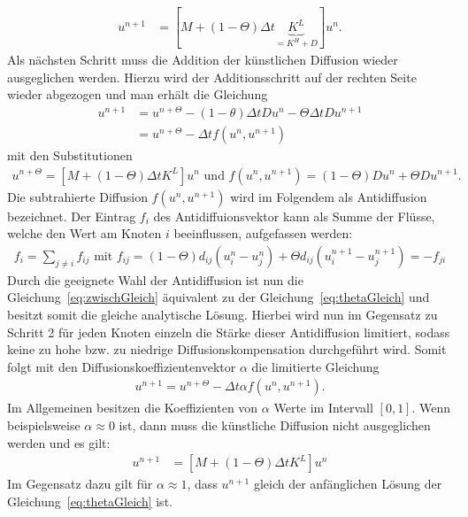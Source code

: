 \documentclass[12pt,titlepage]{article}
\begin{document}
\begin{align}
 [M-\Theta\Delta t\underbrace{K^L}_{\scriptscriptstyle=K^H+D}]u^{n+1}&=[M+(1-\Theta)\Delta t\underbrace{K^L}_{\scriptscriptstyle=K^H+D}]u^n.
\end{align}
Als nächsten Schritt muss die Addition der künstlichen Diffusion wieder ausgeglichen werden. Hierzu wird der Additionsschritt auf der rechten Seite wieder abgezogen und man erhält die Gleichung
\begin{align}
 [M-\Theta\Delta tK^L]u^{n+1}&=u^{n+\Theta} -(1-\theta)\Delta tDu^n-\Theta\Delta tDu^{n+1}\nonumber\\
 &=u^{n+\Theta}-\Delta tf(u^n,u^{n+1})\label{eq:zwischGleich}
\end{align}
mit den Substitutionen
\begin{align}
 u^{n+\Theta}=[M+(1-\Theta)\Delta tK^L]u^n \text{ und } f(u^n,u^{n+1})=(1-\Theta)Du^n+\Theta Du^{n+1}.\nonumber
\end{align}
Die subtrahierte Diffusion $f(u^n,u^{n+1})$ wird im Folgendem als Antidiffusion bezeichnet. Der Eintrag $f_i$ des Antidiffuionsvektor kann als Summe der Flüsse, welche den Wert am Knoten $i$ beeinflussen, aufgefassen werden:
\begin{align}
 f_i=\sum\limits_{j\neq i}f_{ij}\text{ mit }f_{ij}=(1-\Theta)d_{ij}(u_i^n-u_j^n)+\Theta d_{ij}(u_i^{n+1}-u_j^{n+1})=-f_{ji}\nonumber
\end{align}
Durch die geeignete Wahl der Antidiffusion ist nun die Gleichung~\eqref{eq:zwischGleich} äquivalent zu der Gleichung~\eqref{eq:thetaGleich} und besitzt somit die gleiche analytische Lösung. Hierbei wird nun im Gegensatz zu Schritt 2 für jeden Knoten einzeln die Stärke dieser Antidiffusion limitiert, sodass keine zu hohe bzw. zu niedrige Diffusionskompensation durchgeführt wird. Somit folgt mit den Diffusionskoeffizientenvektor $\alpha$ die limitierte Gleichung
\begin{align}
  [M-\Theta\Delta tK^L]u^{n+1}=u^{n+\Theta}-\Delta t\alpha f(u^n,u^{n+1}).\label{eq:alphaGleich}
\end{align}
Im Allgemeinen besitzen die Koeffizienten von $\alpha$ Werte im Intervall $[0,1]$. Wenn beispielsweise $\alpha\approx0$ ist, dann muss die künstliche Diffusion nicht ausgeglichen werden und es gilt:
\begin{align}
 [M-\Theta\Delta tK^L]u^{n+1}&=[M+(1-\Theta)\Delta tK^L]u^n
\end{align}
Im Gegensatz dazu gilt für $\alpha\approx1$, dass $u^{n+1}$ gleich der anfänglichen Lösung der Gleichung~\eqref{eq:thetaGleich} ist.\\
\end{document}
